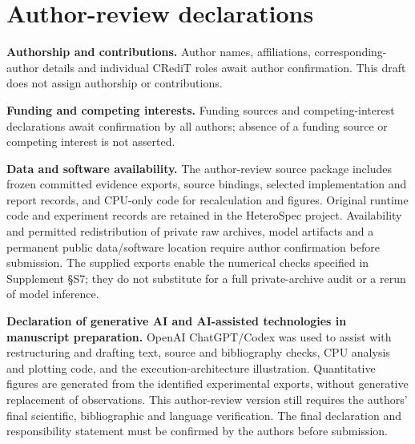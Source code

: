 \section*{Author-review declarations}
\textbf{Authorship and contributions.} Author names, affiliations, corresponding-author details and individual CRediT roles await author confirmation. This draft does not assign authorship or contributions.

\textbf{Funding and competing interests.} Funding sources and competing-interest declarations await confirmation by all authors; absence of a funding source or competing interest is not asserted.

\textbf{Data and software availability.} The author-review source package includes frozen committed evidence exports, source bindings, selected implementation and report records, and CPU-only code for recalculation and figures. Original runtime code and experiment records are retained in the HeteroSpec project. Availability and permitted redistribution of private raw archives, model artifacts and a permanent public data/software location require author confirmation before submission. The supplied exports enable the numerical checks specified in Supplement \S S7; they do not substitute for a full private-archive audit or a rerun of model inference.

\textbf{Declaration of generative AI and AI-assisted technologies in manuscript preparation.} OpenAI ChatGPT/Codex was used to assist with restructuring and drafting text, source and bibliography checks, CPU analysis and plotting code, and the execution-architecture illustration. Quantitative figures are generated from the identified experimental exports, without generative replacement of observations. This author-review version still requires the authors' final scientific, bibliographic and language verification. The final declaration and responsibility statement must be confirmed by the authors before submission.
